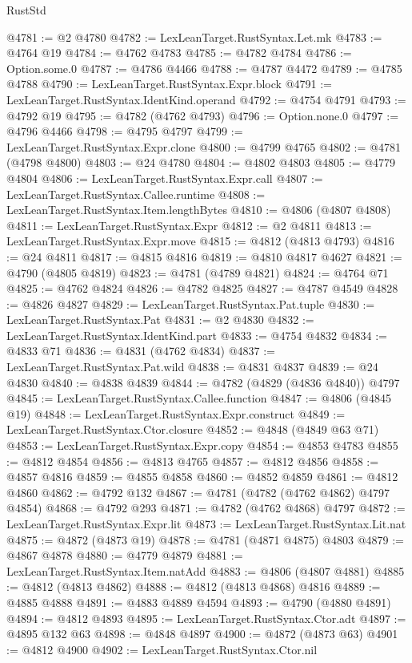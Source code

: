 \begin{lexlean}{RustStd}
\begin{coremodule}
@4781 := @2 @4780
@4782 := LexLeanTarget.RustSyntax.Let.mk
@4783 := @4764 @19
@4784 := @4762 @4783
@4785 := @4782 @4784
@4786 := Option.some.{0}
@4787 := @4786 @4466
@4788 := @4787 @4472
@4789 := @4785 @4788
@4790 := LexLeanTarget.RustSyntax.Expr.block
@4791 := LexLeanTarget.RustSyntax.IdentKind.operand
@4792 := @4754 @4791
@4793 := @4792 @19
@4795 := @4782 (@4762 @4793)
@4796 := Option.none.{0}
@4797 := @4796 @4466
@4798 := @4795 @4797
@4799 := LexLeanTarget.RustSyntax.Expr.clone
@4800 := @4799 @4765
@4802 := @4781 (@4798 @4800)
@4803 := @24 @4780
@4804 := @4802 @4803
@4805 := @4779 @4804
@4806 := LexLeanTarget.RustSyntax.Expr.call
@4807 := LexLeanTarget.RustSyntax.Callee.runtime
@4808 := LexLeanTarget.RustSyntax.Item.lengthBytes
@4810 := @4806 (@4807 @4808)
@4811 := LexLeanTarget.RustSyntax.Expr
@4812 := @2 @4811
@4813 := LexLeanTarget.RustSyntax.Expr.move
@4815 := @4812 (@4813 @4793)
@4816 := @24 @4811
@4817 := @4815 @4816
@4819 := @4810 @4817 @4627
@4821 := @4790 (@4805 @4819)
@4823 := @4781 (@4789 @4821)
@4824 := @4764 @71
@4825 := @4762 @4824
@4826 := @4782 @4825
@4827 := @4787 @4549
@4828 := @4826 @4827
@4829 := LexLeanTarget.RustSyntax.Pat.tuple
@4830 := LexLeanTarget.RustSyntax.Pat
@4831 := @2 @4830
@4832 := LexLeanTarget.RustSyntax.IdentKind.part
@4833 := @4754 @4832
@4834 := @4833 @71
@4836 := @4831 (@4762 @4834)
@4837 := LexLeanTarget.RustSyntax.Pat.wild
@4838 := @4831 @4837
@4839 := @24 @4830
@4840 := @4838 @4839
@4844 := @4782 (@4829 (@4836 @4840)) @4797
@4845 := LexLeanTarget.RustSyntax.Callee.function
@4847 := @4806 (@4845 @19)
@4848 := LexLeanTarget.RustSyntax.Expr.construct
@4849 := LexLeanTarget.RustSyntax.Ctor.closure
@4852 := @4848 (@4849 @63 @71)
@4853 := LexLeanTarget.RustSyntax.Expr.copy
@4854 := @4853 @4783
@4855 := @4812 @4854
@4856 := @4813 @4765
@4857 := @4812 @4856
@4858 := @4857 @4816
@4859 := @4855 @4858
@4860 := @4852 @4859
@4861 := @4812 @4860
@4862 := @4792 @132
@4867 := @4781 (@4782 (@4762 @4862) @4797 @4854)
@4868 := @4792 @293
@4871 := @4782 (@4762 @4868) @4797
@4872 := LexLeanTarget.RustSyntax.Expr.lit
@4873 := LexLeanTarget.RustSyntax.Lit.nat
@4875 := @4872 (@4873 @19)
@4878 := @4781 (@4871 @4875) @4803
@4879 := @4867 @4878
@4880 := @4779 @4879
@4881 := LexLeanTarget.RustSyntax.Item.natAdd
@4883 := @4806 (@4807 @4881)
@4885 := @4812 (@4813 @4862)
@4888 := @4812 (@4813 @4868) @4816
@4889 := @4885 @4888
@4891 := @4883 @4889 @4594
@4893 := @4790 (@4880 @4891)
@4894 := @4812 @4893
@4895 := LexLeanTarget.RustSyntax.Ctor.adt
@4897 := @4895 @132 @63
@4898 := @4848 @4897
@4900 := @4872 (@4873 @63)
@4901 := @4812 @4900
@4902 := LexLeanTarget.RustSyntax.Ctor.nil

\end{coremodule}
\end{lexlean}
